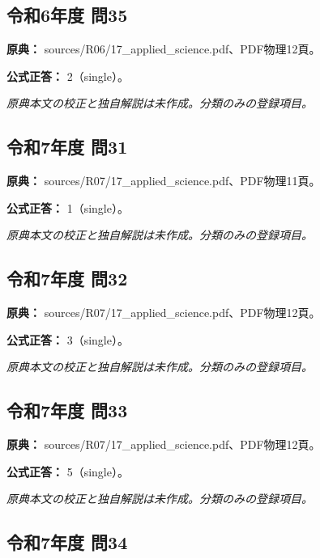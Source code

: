 \subsection{令和6年度 問35}
\label{q:r06-reg-applied-35}

\noindent\textbf{原典：} sources/R06/17\_applied\_science.pdf、PDF物理12頁。

\textbf{公式正答：} 2（single）。

\par\textit{原典本文の校正と独自解説は未作成。分類のみの登録項目。}

\subsection{令和7年度 問31}
\label{q:r07-reg-applied-31}

\noindent\textbf{原典：} sources/R07/17\_applied\_science.pdf、PDF物理11頁。

\textbf{公式正答：} 1（single）。

\par\textit{原典本文の校正と独自解説は未作成。分類のみの登録項目。}

\subsection{令和7年度 問32}
\label{q:r07-reg-applied-32}

\noindent\textbf{原典：} sources/R07/17\_applied\_science.pdf、PDF物理12頁。

\textbf{公式正答：} 3（single）。

\par\textit{原典本文の校正と独自解説は未作成。分類のみの登録項目。}

\subsection{令和7年度 問33}
\label{q:r07-reg-applied-33}

\noindent\textbf{原典：} sources/R07/17\_applied\_science.pdf、PDF物理12頁。

\textbf{公式正答：} 5（single）。

\par\textit{原典本文の校正と独自解説は未作成。分類のみの登録項目。}

\subsection{令和7年度 問34}
\label{q:r07-reg-applied-34}

